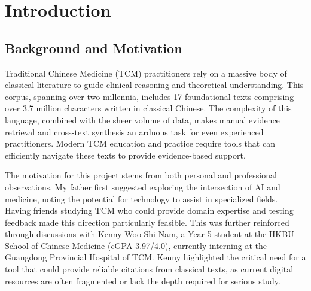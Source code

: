 \documentclass[11pt,a4paper]{report}
\begin{document}
\begin{abstract}
Traditional Chinese Medicine (TCM) practitioners face significant challenges in retrieving and synthesizing evidence from a vast corpus of classical literature. Existing Large Language Models (LLMs) often function as ``black boxes,'' providing claims that lack traceable links to authoritative source material. This project introduces TCM-Sage, an evidence-synthesis tool designed to provide transparent, citation-backed insights from 17 foundational TCM texts comprising 3.72 million characters and 12,204 indexed chunks. By implementing a Retrieval-Augmented Generation (RAG) pipeline with hybrid retrieval---combining DashScope text-embedding-v4 vector search with the SymMap v2.0 knowledge graph (18,450 entities)---TCM-Sage ensures every claim is traceable to its original source. Evaluation via a blind A/B Arena system with 59 votes from TCM students and practitioners yielded a paired t-test result of $t = 3.44$, $p = 0.0011$ ($p < 0.01$), and Cohen's $d = 0.45$ (medium effect), demonstrating statistically significant preference for the RAG system over a general-purpose LLM with web search.
\end{abstract}

\chapter{Introduction}

\section{Background and Motivation}
Traditional Chinese Medicine (TCM) practitioners rely on a massive body of classical literature to guide clinical reasoning and theoretical understanding. This corpus, spanning over two millennia, includes 17 foundational texts comprising over 3.7 million characters written in classical Chinese. The complexity of this language, combined with the sheer volume of data, makes manual evidence retrieval and cross-text synthesis an arduous task for even experienced practitioners. Modern TCM education and practice require tools that can efficiently navigate these texts to provide evidence-based support.

The motivation for this project stems from both personal and professional observations. My father first suggested exploring the intersection of AI and medicine, noting the potential for technology to assist in specialized fields. Having friends studying TCM who could provide domain expertise and testing feedback made this direction particularly feasible. This was further reinforced through discussions with Kenny Woo Shi Nam, a Year 5 student at the HKBU School of Chinese Medicine (cGPA 3.97/4.0), currently interning at the Guangdong Provincial Hospital of TCM. Kenny highlighted the critical need for a tool that could provide reliable citations from classical texts, as current digital resources are often fragmented or lack the depth required for serious study.
\end{document}
